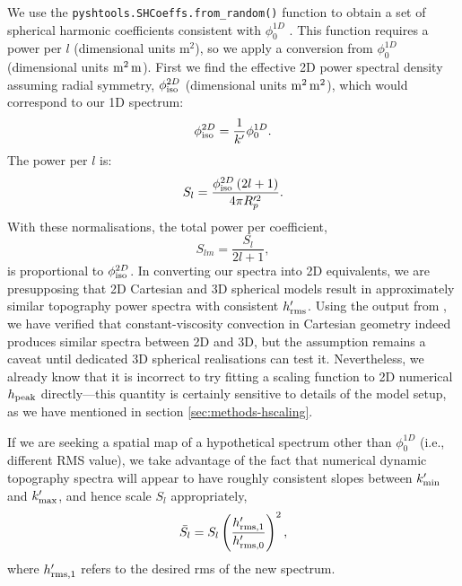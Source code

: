 We use the {\tt pyshtools.SHCoeffs.from{\_}random()} function to obtain a set of spherical harmonic coefficients consistent with $\phi^{1D}_0$ \citep{wieczorek_shtools_2018}. This function requires a power per $l$ (dimensional units m$^2$), so we apply a conversion from $\phi^{1D}_0$ (dimensional units $\rm{m^2\,m}$). First we find the effective 2D power spectral density assuming radial symmetry, $\phi^{2D}_{\rm iso}$ (dimensional units $\rm{m^2\,m^2}$), which would correspond to our 1D spectrum:
\begin{equation}
\phi^{2D}_{\rm iso} = \frac{1}{k^\prime} \phi^{1D}_0.
\end{equation}
The power per $l$ is:
\begin{equation}
S_l = \frac{\phi^{2D}_{\rm iso} \left(2 l + 1\right)}{4 \pi R_p^{\prime 2}}.
\end{equation}
With these normalisations, the total power per coefficient,
\begin{equation}
S_{lm} = \frac{S_l}{2l + 1},
\end{equation}
is proportional to $\phi^{2D}_{\rm iso}$. In converting our spectra into 2D equivalents, we are presupposing that 2D Cartesian and 3D spherical models result in approximately similar topography power spectra with consistent $h_{\rm rms}^\prime$. Using the output from \citet{lees_gravity_2020}, we have verified that constant-viscosity convection in Cartesian geometry indeed produces similar spectra between 2D and 3D, but the assumption remains a caveat until dedicated 3D spherical realisations can test it. Nevertheless, we already know that it is incorrect to try fitting a scaling function to 2D numerical $h_{\rm peak}$ directly---this quantity is certainly sensitive to details of the model setup, as we have mentioned in section \ref{sec:methods-hscaling}.

If we are seeking a spatial map of a hypothetical spectrum other than $\phi^{1D}_0$ (i.e., different RMS value), we take advantage of the fact that numerical dynamic topography spectra will appear to have roughly consistent slopes between $k^\prime_{\rm min}$ and $k^\prime_{\rm max}$, and hence scale $S_l$ appropriately, 
\begin{equation}
\bar{S_l} = S_l \left(\frac{h^{\prime}_{{\rm rms}, 1}}{h^\prime_{{\rm rms}, 0}}\right)^2,
\end{equation}
where $h^{\prime}_{{\rm rms}, 1}$ refers to the desired rms of the new spectrum. 

